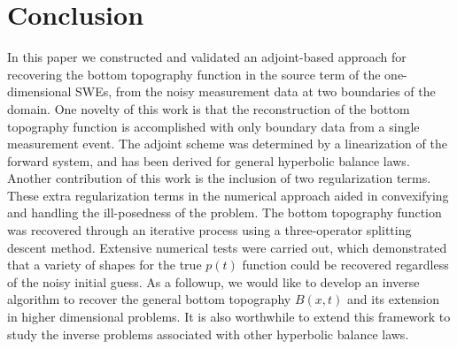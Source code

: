 \section{Conclusion}\label{sec_conclusion}

In this paper we constructed and validated an adjoint-based approach for recovering the bottom topography function in the source term of the one-dimensional SWEs, from the noisy measurement data at two boundaries of the domain. 
One novelty of this work is that the reconstruction of the bottom topography function is accomplished with only boundary data from a single measurement event. %
The adjoint scheme was determined by a linearization of the forward system, and has been derived for general hyperbolic balance laws. 
Another contribution of this work is the inclusion of two regularization terms. These extra regularization terms in the numerical approach aided in convexifying and handling the ill-posedness of the problem. The bottom topography function was recovered through an iterative process using a three-operator splitting descent method. Extensive numerical tests were carried out, which demonstrated that a variety of shapes for the true $p(t)$ function could be recovered regardless of the noisy initial guess. 
As a followup, we would like to develop an inverse algorithm to recover the general bottom topography $B(x,t)$ and its extension in higher dimensional problems. 
It is also worthwhile to extend this framework to study the inverse problems associated with other hyperbolic balance laws.